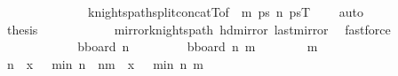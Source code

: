 \begin{isabellebody}
\ \ \ \ \ \ \ \ \ \ \ \ \ \ knights{\isacharunderscore}{\kern0pt}path{\isacharunderscore}{\kern0pt}split{\isacharunderscore}{\kern0pt}concatT{\isacharbrackleft}{\kern0pt}of\ {}\ m\ {\isacharquery}{\kern0pt}ps\ {\isachardoublequoteopen}n{\isacharminus}{\kern0pt}{}{\isachardoublequoteclose}\ {\isacharquery}{\kern0pt}psT\ {\isachardoublequoteopen}{\isacharparenleft}{\kern0pt}{}{\isacharcomma}{\kern0pt}{}{\isacharparenright}{\kern0pt}{\isachardoublequoteclose}\ {\isachardoublequoteopen}{\isacharparenleft}{\kern0pt}{}{\isacharcomma}{\kern0pt}{}{\isacharparenright}{\kern0pt}{\isachardoublequoteclose}{\isacharbrackright}{\kern0pt}\ \isamarkupfalse%
\ auto\isanewline
\ \ \ \ \ \ \ \ \isamarkupfalse%
\ \isamarkupfalse%
\ {\isacharquery}{\kern0pt}thesis\isanewline
\ \ \ \ \ \ \ \ \ \ \isamarkupfalse%
\ mirror{}{\isacharunderscore}{\kern0pt}knights{\isacharunderscore}{\kern0pt}path\ hd{\isacharunderscore}{\kern0pt}mirror{}\ last{\isacharunderscore}{\kern0pt}mirror{}\ \isamarkupfalse%
\ fastforce\isanewline
\ \ \ \ \ \ \isamarkupfalse%
\isanewline
\ \ \ \ \isamarkupfalse%
\isanewline
\ \ \ \ \ \ \isamarkupfalse%
\ {\isacharquery}{\kern0pt}bboard\ n\ {}{\isachardoublequoteclose}\isanewline
\ \ \ \ \ \ \isamarkupfalse%
\ {\isacharquery}{\kern0pt}bboard\ n\ {\isacharparenleft}{\kern0pt}m{\isacharminus}{\kern0pt}{}{\isacharparenright}{\kern0pt}{\isachardoublequoteclose}\isanewline
\ \ \ \ \ \ \isamarkupfalse%
\ {\isachardoublequoteopen}m\ {\isasymge}\ {}{}{\isachardoublequoteclose}\isanewline
\ \ \ \ \ \ \isamarkupfalse%
\ \isamarkupfalse%
\ {\isachardoublequoteopen}n{\isacharplus}{\kern0pt}{}\ {\isacharless}{\kern0pt}\ x{\isachardoublequoteclose}\ {\isachardoublequoteopen}{}\ {\isasymle}\ min\ n\ {}{\isachardoublequoteclose}\ {\isachardoublequoteopen}n{\isacharplus}{\kern0pt}{\isacharparenleft}{\kern0pt}m{\isacharminus}{\kern0pt}{}{\isacharparenright}{\kern0pt}\ {\isacharless}{\kern0pt}\ x{\isachardoublequoteclose}\ {\isachardoublequoteopen}{}\ {\isasymle}\ min\ n\ {\isacharparenleft}{\kern0pt}m{\isacharminus}{\kern0pt}{}{\isacharparenright}{\kern0pt}{\isachardoublequoteclose}\ \isanewline

\end{isabellebody}
